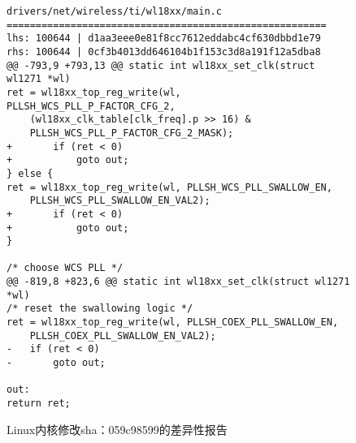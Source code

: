 \begin{figure}
	\centering
\begin{lstlisting}
drivers/net/wireless/ti/wl18xx/main.c
=======================================================
lhs: 100644 | d1aa3eee0e81f8cc7612eddabc4cf630dbbd1e79
rhs: 100644 | 0cf3b4013dd646104b1f153c3d8a191f12a5dba8
@@ -793,9 +793,13 @@ static int wl18xx_set_clk(struct wl1271 *wl)
ret = wl18xx_top_reg_write(wl, PLLSH_WCS_PLL_P_FACTOR_CFG_2,
	(wl18xx_clk_table[clk_freq].p >> 16) &
	PLLSH_WCS_PLL_P_FACTOR_CFG_2_MASK);
+		if (ret < 0)
+			goto out;
} else {
ret = wl18xx_top_reg_write(wl, PLLSH_WCS_PLL_SWALLOW_EN,
	PLLSH_WCS_PLL_SWALLOW_EN_VAL2);
+		if (ret < 0)
+			goto out;
}

/* choose WCS PLL */
@@ -819,8 +823,6 @@ static int wl18xx_set_clk(struct wl1271 *wl)
/* reset the swallowing logic */
ret = wl18xx_top_reg_write(wl, PLLSH_COEX_PLL_SWALLOW_EN,
	PLLSH_COEX_PLL_SWALLOW_EN_VAL2);
-	if (ret < 0)
-		goto out;

out:
return ret;

\end{lstlisting}
	\caption{
	Linux内核修改sha：059c98599的差异性报告
	}
	\label{fig:2-3-diff}
\end{figure}